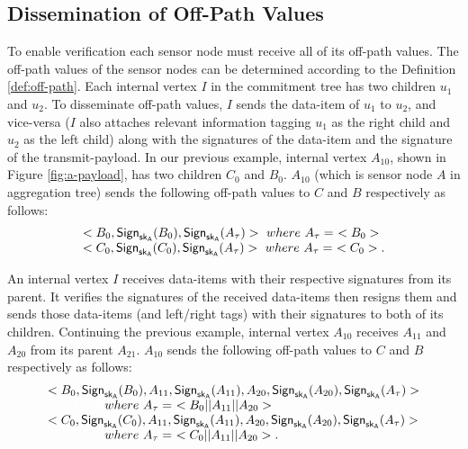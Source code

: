 	\subsection{Dissemination of Off-Path Values}
		To enable verification each sensor node must receive all of its off-path values.
		The off-path values of the sensor nodes can be determined according to the Definition \ref{def:off-path}.
		Each internal vertex $I$ in the commitment tree has two children $u_{1}$ and $u_{2}$. 
		To disseminate off-path values, $I$ sends the data-item of $u_{1}$ to $u_{2}$, and vice-versa ($I$ also attaches relevant information tagging $u_{1}$ as the right child and $u_{2}$ as the left child) along with the signatures of the data-item and the signature of the transmit-payload.
		In our previous example, internal vertex $A_{10}$, shown in Figure \ref{fig:a-payload}, has two children $C_{0}$ and $B_{0}$.
		$A_{10}$ (which is sensor node $A$ in aggregation tree) sends the following off-path values to $C$ and $B$ respectively as follows:
			\begin{equation*}
				\begin{array}{l}
					<B_{0}, \textsf{Sign}_{\sk_{A}}(B_{0}),\textsf{Sign}_{\sk_{A}}(A_{\tau})>\ where\ A_{\tau} =\ <B_{0}>\\
					<C_{0}, \textsf{Sign}_{\sk_{A}}(C_{0}),\textsf{Sign}_{\sk_{A}}(A_{\tau})>\ where\ A_{\tau} =\ <C_{0}>.
				\end{array}
			\end{equation*}
		
		An internal vertex $I$ receives data-items with their respective signatures from its parent. 
		It verifies the signatures of the received data-items then resigns them and sends those data-items (and left/right tags) with their signatures to both of its children.
		Continuing the previous example, internal vertex $A_{10}$ receives $A_{11}$ and $A_{20}$ from its parent $A_{21}$.
		$A_{10}$ sends the following off-path values to $C$ and $B$ respectively as follows:
		\begin{equation*}
			\begin{array}{l}
				<B_{0}, \textsf{Sign}_{\sk_{A}}(B_{0}),A_{11},\textsf{Sign}_{\sk_{A}}(A_{11}),A_{20},\textsf{Sign}_{\sk_{A}}(A_{20}),\textsf{Sign}_{\sk_{A}}(A_{\tau})>\\
					\textcolor{white}{XXXXX}where\  A_{\tau} =\ <B_{0}||A_{11}||A_{20}>\\
				<C_{0}, \textsf{Sign}_{\sk_{A}}(C_{0}),A_{11},\textsf{Sign}_{\sk_{A}}(A_{11}),A_{20},\textsf{Sign}_{\sk_{A}}(A_{20}),\textsf{Sign}_{\sk_{A}}(A_{\tau})>\\ 
					\textcolor{white}{XXXXX}where\  A_{\tau} =\ <C_{0}||A_{11}||A_{20}>.
			\end{array}
		\end{equation*}
		
